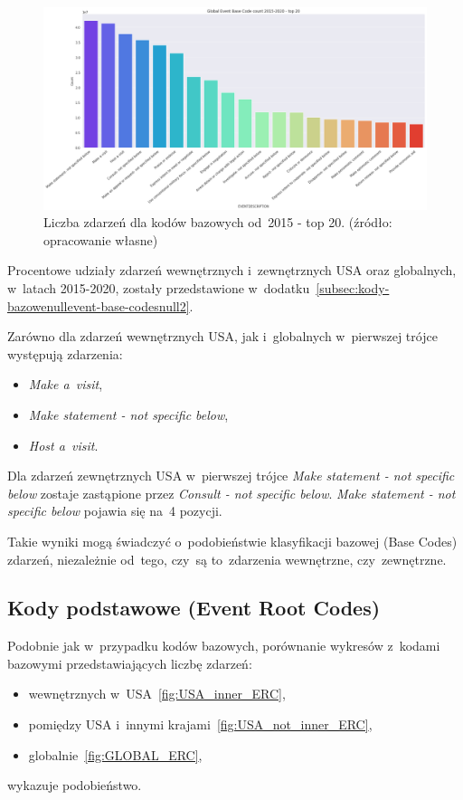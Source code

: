 \documentclass[11pt]{report}
\begin{document}
    \begin{figure}[tp]
        \centering
        \includegraphics[width=\linewidth]{fig/GLOBAL//EBC.png}
        \caption{Liczba zdarzeń dla kodów bazowych od~2015 - top 20. (źródło: opracowanie własne)}
        \label{fig:GLOBAL_EBC}
    \end{figure}

    Procentowe udziały zdarzeń wewnętrznych i~zewnętrznych USA oraz globalnych, w~latach 2015-2020, zostały przedstawione
    w~dodatku~\ref{subsec:kody-bazowenullevent-base-codesnull2}.

    Zarówno dla zdarzeń wewnętrznych USA, jak i~globalnych w~pierwszej trójce występują zdarzenia:
    \begin{itemize}
        \item \textit{Make a~visit},
        \item \textit{Make statement - not specific below},
        \item \textit{Host a~visit}.
    \end{itemize}
    Dla zdarzeń zewnętrznych USA w~pierwszej trójce \textit{Make statement - not specific below} zostaje zastąpione przez \textit{Consult - not specific below}.
    \textit{Make statement - not specific below} pojawia się na~4 pozycji.

    Takie wyniki mogą świadczyć o~podobieństwie klasyfikacji bazowej (Base Codes) zdarzeń,
    niezależnie od~tego, czy~są to~zdarzenia wewnętrzne, czy~zewnętrzne.

    \subsection{Kody podstawowe (Event Root Codes)}\label{subsec:kody-podstawowenullevent-root-codesnull}

    Podobnie jak w~przypadku kodów bazowych, porównanie wykresów z~kodami bazowymi przedstawiających liczbę zdarzeń:
    \begin{itemize}
        \item wewnętrznych w~USA~\ref{fig:USA_inner_ERC},
        \item pomiędzy USA i~innymi krajami~\ref{fig:USA_not_inner_ERC},
        \item globalnie~\ref{fig:GLOBAL_ERC},
    \end{itemize}
    wykazuje podobieństwo.
\end{document}
